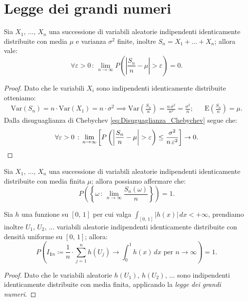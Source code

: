     \section{Legge dei grandi numeri}
        \begin{defn}
            Sia $X_1,\, \ldots,\, X_{n}$ una successione di variabili aleatorie indipendenti identicamente distribuite con media $\mu$ e varianza $\sigma^2$ finite, inoltre $S_n = X_1 + \ldots + X_n$; allora vale: \[
                \forall \varepsilon > 0 \,:\, \lim_{n \to \infty} P\left(\left|\frac{S_n}{n}-\mu\right| > \varepsilon\right) = 0
            .\]
        \end{defn}
        \begin{proof}
            Dato che le variabili $X_i$ sono indipendenti identicamente distribuite otteniamo:
            \begin{align*}
                \text{Var}(S_n) = n\cdot \text{Var}(X_1) = n\cdot \sigma^2  \implies
                \text{Var}\left(\frac{S_n}{n}\right) = \frac{n\, \sigma^2}{n^2} = \frac{\sigma^2}{n};
                & & \text{E}\left(\frac{S_n}{n}\right) = \mu
            .\end{align*}
            Dalla disuguaglianza di Chebychev \eqref{eq:Disuguaglianza_Chebychev} segue che: \[
                \forall \varepsilon > 0 \,:\, \lim_{n \to \infty} \left[P\left(\left|\frac{S_n}{n}-\mu\right|> \varepsilon\right) \leq \frac{\sigma^2}{n\, \varepsilon^2}\right] \rightarrow 0. \qedhere
            \]
        \end{proof}
        \begin{defn}
            Sia $X_1,\, \ldots,\, X_{n}$ una successione di variabili aleatorie indipendenti identicamente distribuite con media finita $\mu$; allora possiamo affermare che: \[
                P\left(\left\{\omega\,:\, \lim_{n \to \infty} \frac{S_n(\omega)}{n}\right\}\right) = 1
            .\]
        \end{defn}
        \begin{prty}
            Sia $h$ una funzione su $[0,\,1]$ per cui valga $\int_{[0,\,1]} |h(x)|\, dx < +\infty$, 
            prendiamo inoltre $U_1,\, U_2,\, \ldots$ variabili aleatorie indipendenti 
            identicamente distribuite con densità uniforme su $[0,\,1]$; allora: \[
                P\left(I_{\mathbf{1}n} \coloneqq \frac{1}{n} \cdot \sum_{j=1}^{n} h(U_j) \rightarrow
                \int_{0}^{1} h(x)\, dx \text{ per } n \rightarrow \infty\right) = 1
            .\] 
        \end{prty}
        \begin{proof}
            Dato che le variabili aleatorie $h(U_1),\, h(U_2),\, \ldots$ sono indipendenti identicamente distribuite con media finita, applicando la \textit{legge dei grandi numeri}.
        \end{proof}
